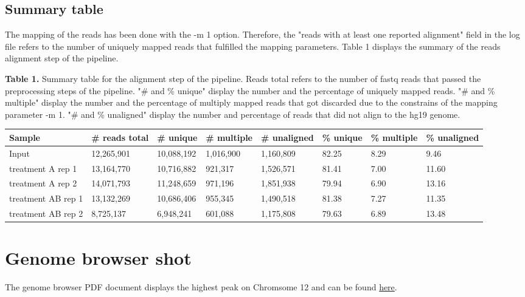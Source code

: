 \documentclass[a4paper,11pt]{article}
\begin{document}
\subsection{Summary table}

\noindent The mapping of the reads has been done with the -m 1 option. Therefore, the "reads with at least one reported alignment" field in the log file refers to the number of uniquely mapped reads that fulfilled the mapping parameters. Table 1 displays the summary of the reads alignment step of the pipeline.\\

\footnotesize

\textbf{Table 1.} Summary table for the alignment step of the pipeline. Reads total refers to the number of fastq reads that passed the preprocessing steps of the pipeline. "\# and \% unique" display the number and the percentage of uniquely mapped reads. "\# and \% multiple" display the number and the percentage of multiply mapped reads that got discarded due to the constrains of the mapping parameter -m 1. "\# and \% unaligned" display the number and percentage of reads that did not align to the hg19 genome.
\begin{flushright}
\begin{tabular}{|p{1.6cm}|p{1.8cm}|p{1.8cm}|p{1.8cm}|p{1.8cm}|p{1.2cm}|p{1.2cm}|p{1.2cm}|}
 \hline 
 Sample & \# reads total & \# unique & \# multiple & \# unaligned & \% unique & \% multiple & \% unaligned \\ 
 \hline 
 Input & 12,265,901 & 10,088,192 & 1,016,900 & 1,160,809 & 82.25 & 8.29 & 9.46 \\ 
 \hline 
 treatment A rep 1 & 13,164,770 & 10,716,882 & 921,317 & 1,526,571 & 81.41 & 7.00 & 11.60 \\ 
 \hline 
 treatment A rep 2 & 14,071,793 & 11,248,659 & 971,196 & 1,851,938 & 79.94 & 6.90 & 13.16 \\ 
 \hline 
 treatment AB rep 1 & 13,132,269 & 10,686,406 & 955,345 & 1,490,518 & 81.38 & 7.27 & 11.35 \\ 
 \hline 
 treatment AB rep 2 & 8,725,137 & 6,948,241 & 601,088 & 1,175,808 & 79.63 & 6.89 & 13.48 \\ 
 \hline 
 \end{tabular}  

\end{flushright} 
 \normalsize

\section{Genome browser shot}
The genome browser PDF document displays the highest peak on Chromsome 12 and can be found \color{blue}\href{https://github.com/biancamocanu/MCB5430_midterm/blob/master/hgt_genome_64f1_bc6f0.pdf}{here}. \color{black} 
\pagebreak
\end{document}

